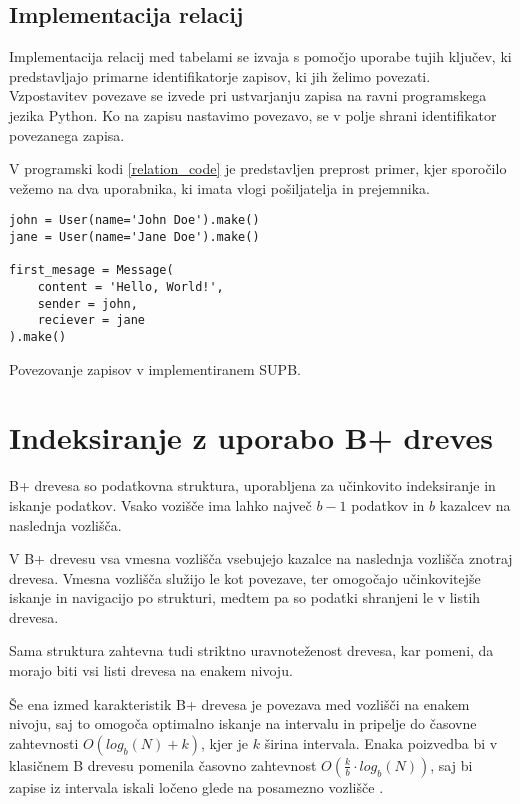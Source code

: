 \documentclass[a4paper,12pt,openright]{book}
\begin{document}
        \subsection{Implementacija relacij}

        Implementacija relacij med tabelami se izvaja s pomočjo uporabe tujih klju\-čev, ki predstavljajo primarne identifikatorje zapisov, ki jih želimo povezati. Vzpostavitev povezave se izvede pri ustvarjanju zapisa na ravni programskega jezika Python. Ko na zapisu nastavimo povezavo, se v polje shrani identifikator povezanega zapisa.

        V programski kodi \ref{relation_code} je predstavljen preprost primer, kjer sporočilo veže\-mo na dva uporabnika, ki imata vlogi pošiljatelja in prejemnika.

\begin{code}
\begin{verbatim}
john = User(name='John Doe').make()
jane = User(name='Jane Doe').make()

first_mesage = Message(
    content = 'Hello, World!',
    sender = john,
    reciever = jane
).make()
\end{verbatim}
\caption{Povezovanje zapisov v implementiranem SUPB.}
\label{relation_code}
\end{code}

    \section{Indeksiranje z uporabo B+ dreves}

        B+ drevesa so podatkovna struktura, uporabljena za učinkovito indeksiranje in iskanje podatkov. Vsako vozišče ima lahko največ $b - 1$ podatkov in $b$ kazalcev na naslednja vozlišča.

        V B+ drevesu vsa vmesna vozlišča vsebujejo kazalce na naslednja vozlišča znotraj drevesa. Vmesna vozlišča služijo le kot povezave, ter omogočajo učinkovitejše iskanje in navigacijo po strukturi, medtem pa so podatki shranjeni le v listih drevesa.

        Sama struktura zahtevna tudi striktno uravnoteženost drevesa, kar pomeni, da morajo biti vsi listi drevesa na enakem nivoju.

        Še ena izmed karakteristik B+ drevesa je povezava med vozlišči na enakem nivoju, saj to omogoča optimalno iskanje na intervalu in pripelje do časovne zahtevnosti $O(log_b(N) + k)$, kjer je $k$ širina intervala. Enaka poizvedba bi v klasičnem B drevesu pomenila časovno zahtevnost $O(\frac{k}{b} \cdot log_b(N))$, saj bi zapise iz intervala iskali ločeno glede na posamezno vozlišče \cite{BPTREE}.
\end{document}
